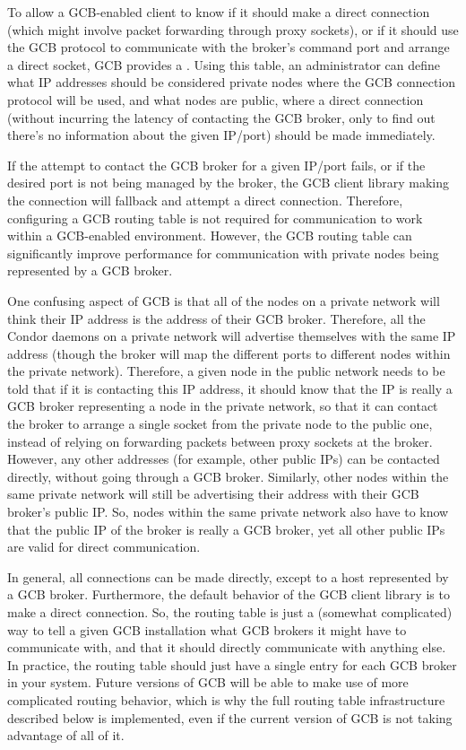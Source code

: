 To allow a GCB-enabled client to know if it should make a direct
connection (which might involve packet forwarding through proxy
sockets), or if it should use the GCB protocol to communicate with the
broker's command port and arrange a direct socket,
GCB provides a .
Using this table, an administrator can define what IP addresses should
be considered private nodes where the GCB connection protocol will be
used, and what nodes are public, where a direct connection (without
incurring the latency of contacting the GCB broker, only to find out
there's no information about the given IP/port) should be made
immediately. 

If the attempt to contact the GCB broker for a given IP/port fails, or
if the desired port is not being managed by the broker, the GCB client
library making the connection will fallback and attempt a direct
connection.
Therefore, configuring a GCB routing table is not required for
communication to work within a GCB-enabled environment.
However, the GCB routing table can significantly improve performance
for communication with private nodes being represented by a GCB
broker. 

One confusing aspect of GCB is that all of the nodes on a private
network will think their IP address is the address of their GCB
broker.
Therefore, all the Condor daemons on a private network will advertise
themselves with the same IP address (though the broker will map the
different ports to different nodes within the private network).
Therefore, a given node in the public network needs to be told that if
it is contacting this IP address, it should know that the IP is really
a GCB broker representing a node in the private network, so that it
can contact the broker to arrange a single socket from the private
node to the public one, instead of relying on forwarding packets
between proxy sockets at the broker.
However, any other addresses (for example, other public IPs) can be
contacted directly, without going through a GCB broker.
Similarly, other nodes within the same private network will still be
advertising their address with their GCB broker's public IP.
So, nodes within the same private network also have to know that the
public IP of the broker is really a GCB broker, yet all other public
IPs are valid for direct communication.

In general, all connections can be made directly, except to a host
represented by a GCB broker.
Furthermore, the default behavior of the GCB client library is to make
a direct connection.
So, the routing table is just a (somewhat complicated) way to tell a
given GCB installation what GCB brokers it might have to communicate
with, and that it should directly communicate with anything else.
In practice, the routing table should just have a single entry for
each GCB broker in your system.
Future versions of GCB will be able to make use of more complicated
routing behavior, which is why the full routing table infrastructure
described below is implemented, even if the current version of GCB is
not taking advantage of all of it.


